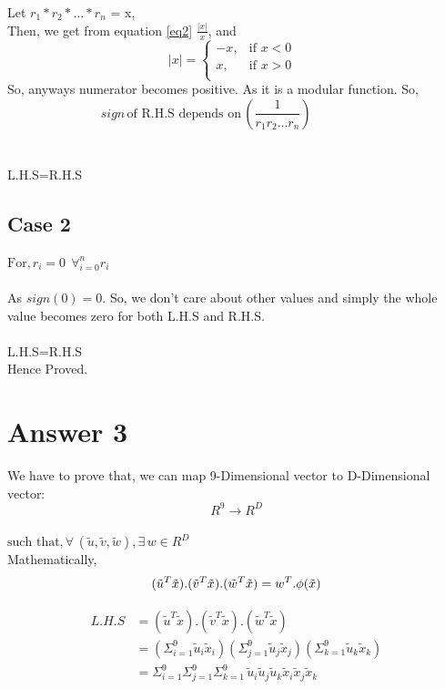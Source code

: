 \documentclass{article}
\begin{document}
Let $r_1*r_2* \dots *r_n $ = x,\\
Then, we get from equation \ref{eq2}  $\frac{|x|}{x}$, and \\
$$
|x|=\begin{cases}
			-x, & \text{if $x<0$ }\\
            x, & \text{if $x>0$}\\
		 \end{cases}
$$
So, anyways numerator becomes positive. As it is a modular function. So, \\
\[ sign \, \text{of R.H.S depends on} \, (\frac{1}{r_1r_2 \dots r_n}) \hspace{2cm} \]\\\\
\hspace*{6cm}  L.H.S=R.H.S\\ %

\subsection{Case 2} 

$\text{For,} \,  r_i = 0  \;\, \forall_{i=0}^n r_i $ \\\\ As $sign(0)=0$. So, we don't care about other values and simply the whole value becomes zero for both L.H.S and R.H.S.\\\\
\hspace*{6cm}  L.H.S=R.H.S\\
\hspace*{6cm} Hence Proved.



\section{Answer 3}%
We have to prove that, we can map 9-Dimensional vector to D-Dimensional vector:\\
\[R^9 \to R^D\]
\\
$\text{such that,} \, \forall \, (\tilde{u},\tilde{v},\tilde{w}), \exists \, w \in R^D$\\ %
Mathematically,
\begin{equation}
(\tilde{u}^T\tilde{x}).(\tilde{v}^T\tilde{x}).(\tilde{w}^T\tilde{x}) = w^T.\phi(\tilde{x})\\
\end{equation}

\begin{align*} 
L.H.S & = (\tilde{u}^T\tilde{x}).(\tilde{v}^T\tilde{x}).(\tilde{w}^T\tilde{x})\\
& = (\Sigma_{i=1}^9 \tilde{u}_i\tilde{x}_i)(\Sigma_{j=1}^9 \tilde{u}_j\tilde{x}_j)(\Sigma_{k=1}^9 \tilde{u}_k\tilde{x}_k)\\
& = \Sigma_{i=1}^9\Sigma_{j=1}^9\Sigma_{k=1}^9 \, \tilde{u}_i\tilde{u}_j\tilde{u}_k\tilde{x}_i\tilde{x}_j\tilde{x}_k\\
\end{align*}
\end{document}
